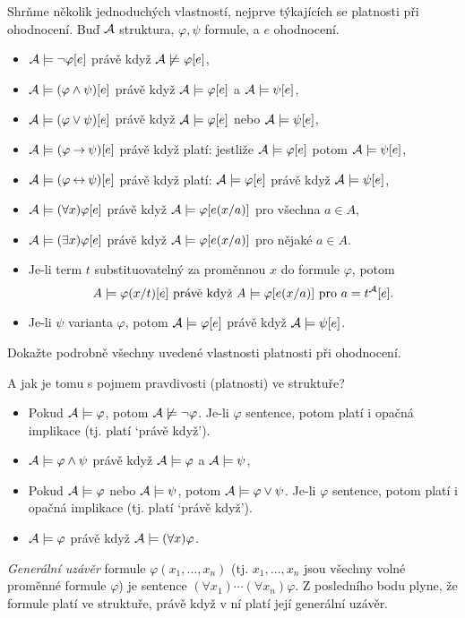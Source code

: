 Shrňme několik jednoduchých vlastností, nejprve týkajících se platnosti při ohodnocení. Buď $\mathcal{A}$ struktura, $\varphi,\psi$ formule, a $e$ ohodnocení.
\begin{itemize}
    \item $\mathcal{A}\models\neg\varphi[e]$ právě když $\mathcal{A}\not\models\varphi[e]$,
    \item $\mathcal{A}\models(\varphi\land\psi)[e]$ právě když $\mathcal{A}\models\varphi[e]$ a $\mathcal{A}\models\psi[e]$,
    \item $\mathcal{A}\models(\varphi\lor\psi)[e]$ právě když $\mathcal{A}\models\varphi[e]$ nebo $\mathcal{A}\models\psi[e]$,
    \item $\mathcal{A}\models(\varphi\mathbin{\rightarrow}\psi)[e]$ právě když platí: jestliže $\mathcal{A}\models\varphi[e]$ potom $\mathcal{A} \models\psi[e]$,
    \item $\mathcal{A}\models(\varphi\mathbin{\leftrightarrow}\psi)[e]$ právě když platí: $\mathcal{A}\models\varphi[e]$ právě když $\mathcal{A}\models\psi[e]
    $,
    \item $\mathcal{A}\models(\forall x)\varphi[e]$ právě když $\mathcal{A}\models\varphi[e(x/a)]$ pro všechna $a\in A$,
    \item $\mathcal{A}\models(\exists x)\varphi[e]$ právě když $\mathcal{A}\models\varphi[e(x/a)]$ pro nějaké $a\in A$.
    \item Je-li term $t$ substituovatelný za proměnnou $x$ do formule $\varphi$, potom
    $$
    A\models\varphi(x/t)[e]\text{ právě když }A\models\varphi[e(x/a)]\text{ pro }a=t^{\mathcal{A}}[e].
    $$
    \item Je-li $\psi$ varianta $\varphi$, potom $\mathcal{A}\models\varphi[e]$ právě když $\mathcal{A}\models\psi[e]$.
\end{itemize}

\begin{exercise}
    Dokažte podrobně všechny uvedené vlastnosti platnosti při ohodnocení.
\end{exercise}

A jak je tomu s pojmem pravdivosti (platnosti) ve struktuře?
\begin{itemize}
    \item Pokud $\mathcal{A}\models\varphi$, potom $\mathcal{A}\not\models\neg\varphi$. Je-li $\varphi$ sentence, potom platí i opačná implikace (tj. platí `právě když').
    \item $\mathcal{A}\models\varphi\land\psi$ právě když $\mathcal{A}\models\varphi$ a $\mathcal{A}\models\psi$,
    \item Pokud $\mathcal{A}\models\varphi$ nebo $\mathcal{A}\models\psi$, potom $\mathcal{A}\models\varphi\lor\psi$. Je-li $\varphi$ sentence, potom platí i opačná implikace (tj. platí `právě když').
    \item $\mathcal{A}\models\varphi$ právě když $\mathcal{A}\models
    (\forall x)\varphi$.
\end{itemize}
\emph{Generální uzávěr} formule $\varphi(x_1,\dots,x_n)$ (tj. $x_1,\dots,x_n$ jsou všechny volné proměnné formule $\varphi$) je sentence $(\forall x_1)\cdots(\forall x_n)\varphi$. Z posledního bodu plyne, že formule platí ve struktuře, právě když v ní platí její generální uzávěr.

